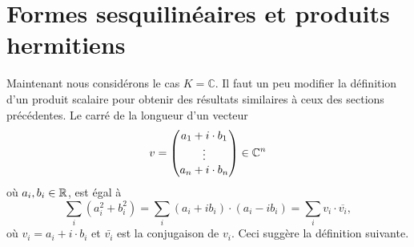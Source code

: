 \section{Formes sesquilinéaires et produits hermitiens}
\label{sec:form-sesq-et}

Maintenant nous considérons le cas $K = ℂ$.
Il faut un peu modifier la définition d'un produit scalaire pour
obtenir des résultats similaires à ceux des sections précédentes.  Le
carré de la longueur d'un vecteur
\begin{displaymath}
  v =
  \begin{pmatrix}
    a_1 + i\cdot  b_1 \\
    \vdots \\
    a_n + i \cdot b_n
  \end{pmatrix} \in \mathbb{C}^n
\end{displaymath}
où $a_i,b_i \in \mathbb{R}$, est égal à 
\begin{displaymath}
  \sum_i (a_i^2 + b_i^2) = \sum_i (a_i + i b_i) \cdot (a_i - i b_i) = \sum_i v_i \cdot \overline{v_i}, 
\end{displaymath}
où $v_i = a_i + i \cdot b_i$ et $\bar{v_i}$ est la conjugaison de $v_i$. Ceci suggère la définition suivante. 

